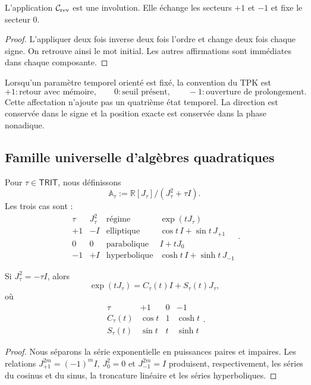 \begin{lemma}
\label{p12-83-c1-s11:lem:trit-reversion}
L’application \(\mathcal C_{\rm rev}\) est une involution. Elle échange les
secteurs \(+1\) et \(-1\) et fixe le secteur \(0\).
\end{lemma}

\begin{proof}
L’appliquer deux fois inverse deux fois l’ordre et change deux fois chaque
signe. On retrouve ainsi le mot initial. Les autres affirmations sont
immédiates dans chaque composante.
\end{proof}

Lorsqu’un paramètre temporel orienté est fixé, la convention du TPK est
\[
 +1:\text{retour avec mémoire},
 \qquad
 0:\text{seuil présent},
 \qquad
 -1:\text{ouverture de prolongement}.
\]
Cette affectation n’ajoute pas un quatrième état temporel. La direction est conservée
dans le signe et la position exacte est conservée dans la phase nonadique.

\subsection{Famille universelle d’algèbres quadratiques}

Pour \(\tau\in\mathsf{TRIT}\), nous définissons
\[
 \mathbb A_\tau:=\mathbb R[J_\tau]/(J_\tau^2+\tau I).
\]
Les trois cas sont :
\[
\begin{array}{c|c|c|c}
\tau&J_\tau^2&\text{régime}&\exp(tJ_\tau)\\\hline
+1&-I&\text{elliptique}&\cos t\,I+\sin t\,J_{+1}\\
0&0&\text{parabolique}&I+tJ_0\\
-1&+I&\text{hyperbolique}&\cosh t\,I+\sinh t\,J_{-1}
\end{array}.
\]

\begin{theorem}
\label{p12-83-c1-s11:thm:trit-exponencial-uniforme}
Si \(J_\tau^2=-\tau I\), alors
\[
 \exp(tJ_\tau)
 =C_\tau(t)I+S_\tau(t)J_\tau,
\]
où
\[
\begin{array}{c|ccc}
\tau&+1&0&-1\\\hline
C_\tau(t)&\cos t&1&\cosh t\\
S_\tau(t)&\sin t&t&\sinh t
\end{array}.
\]
\end{theorem}

\begin{proof}
Nous séparons la série exponentielle en puissances paires et impaires. Les relations
\(J_{+1}^{2m}=(-1)^mI\), \(J_0^2=0\) et
\(J_{-1}^{2m}=I\) produisent, respectivement, les séries du cosinus et du sinus,
la troncature linéaire et les séries hyperboliques.
\end{proof}

